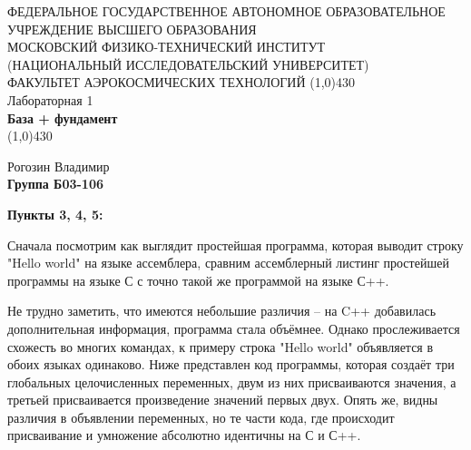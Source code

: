 \documentclass[a4paper,12pt]{article}
\begin{document}
\begin{titlepage}
\begin{center}
\large{\small ФЕДЕРАЛЬНОЕ ГОСУДАРСТВЕННОЕ АВТОНОМНОЕ ОБРАЗОВАТЕЛЬНОЕ\\ УЧРЕЖДЕНИЕ ВЫСШЕГО ОБРАЗОВАНИЯ \\ МОСКОВСКИЙ ФИЗИКО-ТЕХНИЧЕСКИЙ ИНСТИТУТ\\ (НАЦИОНАЛЬНЫЙ ИССЛЕДОВАТЕЛЬСКИЙ УНИВЕРСИТЕТ)\\ ФАКУЛЬТЕТ АЭРОКОСМИЧЕСКИХ ТЕХНОЛОГИЙ}
\vfill
\line(1,0){430}\\[1mm]
\huge{Лабораторная 1}\\
\huge\textbf{База + фундамент}\\
\line(1,0){430}\\[1mm]
\vfill
\begin{flushright}
\normalsize{Рогозин Владимир}\\
\normalsize{\textbf{Группа Б03-106}}\\
\end{flushright}
\end{center}
\end{titlepage}

\textbf{Пункты 3, 4, 5:}

Сначала посмотрим как выглядит простейшая программа, которая выводит строку "Hello world" на языке ассемблера, сравним ассемблерный листинг простейшей программы на языке С с точно такой же программой на языке С++.
\begin{figure}[H]
    \hfill
    \label{fig:Hello world C++ and C}
\end{figure}

Не трудно заметить, что имеются небольшие различия -- на C++ добавилась дополнительная информация, программа стала объёмнее. Однако прослеживается схожесть во многих командах, к примеру строка "Hello world" объявляется в обоих языках одинаково. Ниже представлен код программы, которая создаёт три глобальных целочисленных переменных, двум из них присваиваются значения, а третьей присваивается произведение значений первых двух. Опять же, видны различия в объявлении переменных, но те части кода, где происходит присваивание и умножение абсолютно идентичны на С и С++.  
\end{document}
